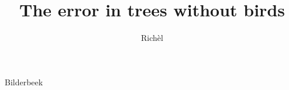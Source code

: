 \documentclass[]{dissertation}
\begin{document}
\title{The error in trees without birds}
\author{Rich\`el}{Bilderbeek}

\frontmatter




\tableofcontents



%

\mainmatter

\thumbtrue







\appendix

%

\thumbfalse



\end{document}
